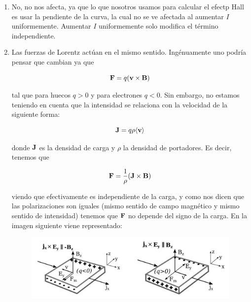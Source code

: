 \begin{enumerate}[label=\alph*)]
    \item No, no nos afecta, ya que lo que nosotros usamos para calcular el efectp Hall es usar la pendiente de la curva, la cual no se ve afectada al aumentar $I$ uniformemente. Aumentar $I$ uniformemente solo modifica el término independiente.  
    
    \item Las fuerzas de Lorentz actúan en el mismo sentido. Ingénuamente uno podría pensar que cambian ya que 
    
    \[
    \mathbf{F} = q (\mathbf{v} \times \mathbf{B})
    \]

    tal que para huecos $q>0$ y para electrones $q<0$. Sin embargo, no estamos teniendo en cuenta que la intensidad se relaciona con la velocidad de la siguiente forma:

    \[
     \mathbf{J} = q \rho \langle \mathbf{v} \rangle
    \]

    donde $\mathbf{J}$ es la densidad de carga y $\rho$ la densidad de portadores. Es decir, tenemos que 

    \[
    \mathbf{F} = \frac{1}{\rho} (\mathbf{J} \times \mathbf{B})
    \]

    viendo que efectivamente es independiente de la carga, y como nos dicen que las polarizaciones son iguales (mismo sentido de campo magnético y mismo sentido de intensidad) tenemos que $\mathbf{F}$ no depende del signo de la carga. En la imagen siguiente viene representado:

    \begin{figure}[H] \centering
        \includegraphics[width=0.8\linewidth]{Cuerpo/Ch_02/Examen_24_6.png} 
    \end{figure}


\end{enumerate}
\vspace*{2em}

